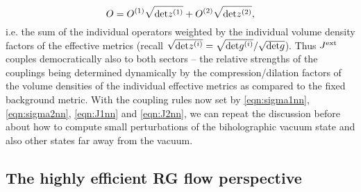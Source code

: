 \documentclass[prd,reprint,a4paper,showpacs,superscriptaddress,11pt,onecolumn,nofootinbib]{revtex4-1}
\renewcommand{\(}{\left(}
\renewcommand{\)}{\right)}
\newcommand{\6}{\partial}
\begin{document}
\begin{equation}
O = O^{(1)} \sqrt{{\rm det }z^{(1)}} + O^{(2)} \sqrt{{\rm det }z^{(2)}},
\end{equation}
i.e. the sum of the individual operators weighted by the individual volume density factors of the effective metrics (recall $\sqrt{{\rm det }z^{(i)}} = \sqrt{{\rm det} g^{(i)}}/\sqrt{{\rm det}g}$). Thus $J^{\rm ext}$ couples democratically also to both sectors -- the relative strengths of the couplings being determined dynamically by the compression/dilation factors of the volume densities of the individual effective metrics as compared to the fixed background metric. With the coupling rules now set by \eqref{eqn:sigma1nn},  \eqref{eqn:sigma2nn},  \eqref{eqn:J1nn} and  \eqref{eqn:J2nn}, we can repeat the discussion before about how to compute small perturbations of the biholographic vacuum state and also other states far away from the vacuum.

\subsection{The highly efficient RG flow perspective}
\end{document}
